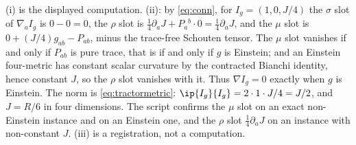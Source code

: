 (i) is the displayed computation. (ii): by \eqref{eq:conn}, for $I_g = (1, 0, J/4)$ the $\sigma$ slot of $\nabla_a I_g$ is $0 - 0 = 0$, the $\rho$ slot is $\tfrac14\partial_a J + P_a{}^b\cdot 0 = \tfrac14\partial_a J$, and the $\mu$ slot is $0 + (J/4)g_{ab} - P_{ab}$, minus the trace-free Schouten tensor. The $\mu$ slot vanishes if and only if $P_{ab}$ is pure trace, that is if and only if $g$ is Einstein; and an Einstein four-metric has constant scalar curvature by the contracted Bianchi identity, hence constant $J$, so the $\rho$ slot vanishes with it. Thus $\nabla I_g = 0$ exactly when $g$ is Einstein. The norm is \eqref{eq:tractormetric}: $\ip{I_g}{I_g} = 2\cdot 1\cdot J/4 = J/2$, and $J = R/6$ in four dimensions. The script confirms the $\mu$ slot on an exact non-Einstein instance and on an Einstein one, and the $\rho$ slot $\tfrac14\partial_a J$ on an instance with non-constant $J$. (iii) is a registration, not a computation.
